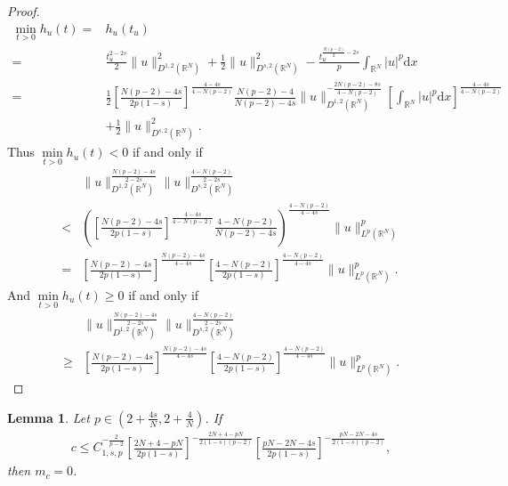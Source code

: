 \documentclass[12pt,a4paper,reqno]{amsart}
\numberwithin{equation}{section}
\newtheorem{lemma}{Lemma}[section]
\begin{document}
\begin{proof}
\begin{equation*}
\begin{aligned}
\min\limits_{t>0}h_{u}(t)=&h_{u}(t_{u})\\
=&\frac{t_{u}^{2-2s}}{2}\|u\|_{D^{1,2}(\mathbb{R}^{N})}^{2}
+\frac{1}{2}\|u\|_{D^{s,2}(\mathbb{R}^{N})}^{2}
-\frac{t_{u}^{\frac{N(p-2)}{2}-2s}}{p}
\int_{\mathbb{R}^{N}}
|u|^{p}
\mathrm{d}x\\
=&\frac{1}{2}\left[\frac{N(p-2)-4s}{2p(1-s)}
\right]^{\frac{4-4s}{4-N(p-2)}}
\frac{N(p-2)-4}{N(p-2)-4s}
\|u\|_{D^{1,2}(\mathbb{R}^{N})}^{-\frac{2N(p-2)-8s}{4-N(p-2)}}
\left[
\int_{\mathbb{R}^{N}}
|u|^{p}
\mathrm{d}x\right]^{\frac{4-4s}{4-N(p-2)}}\\
&+\frac{1}{2}\|u\|_{D^{s,2}(\mathbb{R}^{N})}^{2}.
\end{aligned}
\end{equation*}
Thus $\min\limits_{t>0}h_{u}(t)<0$ if and only if
\begin{equation*}
\begin{aligned}
&\|u\|_{D^{1,2}(\mathbb{R}^{N})}^{\frac{N(p-2)-4s}{2-2s}}
\|u\|_{D^{s,2}(\mathbb{R}^{N})}^{\frac{4-N(p-2)}{2-2s}}\\
<&\left(\left[\frac{N(p-2)-4s}{2p(1-s)}
\right]^{\frac{4-4s}{4-N(p-2)}}
\frac{4-N(p-2)}{N(p-2)-4s}
\right)^{\frac{4-N(p-2)}{4-4s}}
\|u\|_{L^{p}(\mathbb{R}^{N})}^{p}\\
=&
\left[
\frac{N(p-2)-4s}{2p(1-s)}
\right]^{\frac{N(p-2)-4s}{4-4s}}
\left[
\frac{4-N(p-2)}{2p(1-s)}
\right]^{\frac{4-N(p-2)}{4-4s}}
\|u\|_{L^{p}(\mathbb{R}^{N})}^{p}.
\end{aligned}
\end{equation*}
And $\min\limits_{t>0}h_{u}(t)\geqslant0$ if and only if
\begin{equation*}
\begin{aligned}
&\|u\|_{D^{1,2}(\mathbb{R}^{N})}^{\frac{N(p-2)-4s}{2-2s}}
\|u\|_{D^{s,2}(\mathbb{R}^{N})}^{\frac{4-N(p-2)}{2-2s}}\\
\geqslant&
\left[
\frac{N(p-2)-4s}{2p(1-s)}
\right]^{\frac{N(p-2)-4s}{4-4s}}
\left[
\frac{4-N(p-2)}{2p(1-s)}
\right]^{\frac{4-N(p-2)}{4-4s}}
\|u\|_{L^{p}(\mathbb{R}^{N})}^{p}.
\end{aligned}
\end{equation*}
\end{proof}


\begin{lemma}\label{Lemma6.2}
Let $p\in(2+\frac{4s}{N},2+\frac{4}{N})$.
If
\begin{equation*}
\begin{aligned}
c\leqslant C_{1,s,p}^{-\frac{2}{p-2}}
\left[
\frac{2N+4-pN}{2p(1-s)}
\right]^{-\frac{2N+4-pN}{2(1-s)(p-2)}}
\left[
\frac{pN-2N-4s}{2p(1-s)}
\right]^{-\frac{pN-2N-4s}{2(1-s)(p-2)}},
\end{aligned}
\end{equation*}
then $m_{c}=0$.
\end{lemma}
\end{document}
